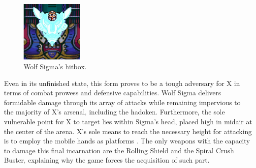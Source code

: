 \begin{figure}[htp]
	\centering		
	\includegraphics[height=3cm]{figures/X1/Sigma_stages/WolfSigma_hitbox.jpg}
	\caption{Wolf Sigma's hitbox.}
\end{figure}
Even in its unfinished state, this form proves to be a tough adversary for X in terms of combat prowess and defensive capabilities. Wolf Sigma delivers formidable damage through its array of attacks while remaining impervious to the majority of X's arsenal, including the hadoken. Furthermore, the sole vulnerable point for X to target lies within Sigma's head, placed high in midair at the center of the arena. X's sole means to reach the necessary height for attacking is to employ the mobile hands as platforms . The only weapons with the capacity to damage this final incarnation are the Rolling Shield and the Spiral Crush Buster, explaining why the game forces the acquisition of such part.



